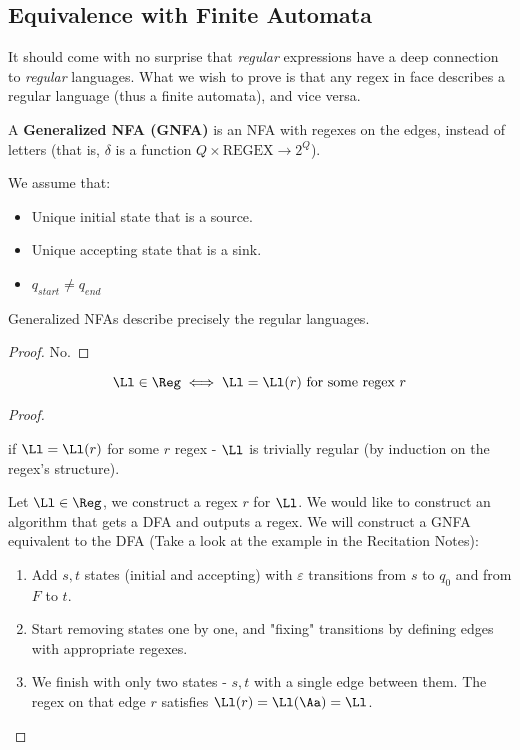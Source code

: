 \subsection{Equivalence with Finite Automata }It should come with no surprise that \textit{regular} expressions have a deep connection to \textit{regular}  languages. What we wish to prove is that any regex in face describes a regular language (thus a finite automata), and vice versa.
\begin{yellowBox}
	\begin{defn}
		 A \textbf{Generalized NFA (GNFA)} is an NFA with regexes on the edges, instead of letters (that is, $\delta$ is a function $Q\times \textrm{REGEX} \to 2^Q$).
	\end{defn}
	\begin{remark}
		We assume that:
		\begin{itemize}
			\item Unique initial state that is a source.
			\item Unique accepting state that is a sink.
			\item $q_{start} \neq q_{end}$
		\end{itemize}
	\end{remark}
\end{yellowBox}
\begin{claim}
	Generalized NFAs describe precisely the regular languages.
\end{claim}
\begin{proof}
	No.
\end{proof}
\begin{blueBox}
	\begin{thm}
		\[
		\Ll\in \Reg \iff \Ll = \Ll(r) \text{ for some regex }r
		\]
	\end{thm}
\end{blueBox}
\begin{proof}
	\begin{mythrm}
		 if $\Ll = \Ll(r)$ for some $r$ regex - $\Ll$ is trivially regular (by induction on the regex's structure).
	\end{mythrm}
	\begin{mythrm}
		 Let $\Ll\in \Reg$, we construct a regex $r$ for $\Ll$. We would like to construct an algorithm that gets a DFA and outputs a regex. We will construct a GNFA equivalent to the DFA (Take a look at the example in the Recitation Notes):
		\begin{enumerate}
			\item Add $s,t$ states (initial and accepting) with $\varepsilon$ transitions from $s$ to $q_0$ and from $F$ to $t$.
			\item Start removing states one by one, and "fixing" transitions by defining edges with appropriate regexes.
			\item We finish with only two states - $s,t$ with a single edge between them. The regex on that edge $r$ satisfies $\Ll(r) = \Ll(\Aa) = \Ll$.
		\end{enumerate} 
	\end{mythrm}
\end{proof}

